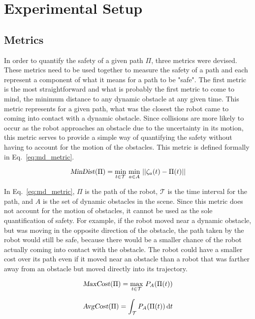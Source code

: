 


\chapter{Experimental Setup}

\label{chapter:experimentalsetup}

\section{Metrics}

In order to quantify the safety of a given path $\Pi$, three metrics were
devised. These metrics need to be used together to measure the safety of a path
and each represent a component of what it means for a path to be "safe". The
first metric is the most straightforward and what is probably the first metric
to come to mind, the minimum distance to any dynamic obstacle at any given
time. This metric represents for a given path, what was the closest the robot
came to coming into contact with a dynamic obstacle. Since collisions are more
likely to occur as the robot approaches an obstacle due to the uncertainty in
its motion, this metric serves to provide a simple way of quantifying the
safety without having to account for the motion of the obstacles. This metric
is defined formally in Eq.~\ref{eq:md_metric}.

\begin{equation}
    \Var{MinDist}(\Pi) = \min_{t \in \mathcal{T}} \, \min_{a \in A} \,
    ||\zeta_a(t) - \Pi(t)||
    \label{eq:md_metric}
\end{equation}

In Eq.~\ref{eq:md_metric}, $\Pi$ is the path of the robot, $\mathcal{T}$ is the
time interval for the path, and $A$ is the set of dynamic obstacles in the
scene. Since this metric does not account for the motion of obstacles, it
cannot be used as the sole quantification of safety. For example, if the robot
moved near a dynamic obstacle, but was moving in the opposite direction of the
obstacle, the path taken by the robot would still be safe, because there would
be a smaller chance of the robot actually coming into contact with the
obstacle. The robot could have a smaller cost over its path even if it moved
near an obstacle than a robot that was farther away from an obstacle but moved
directly into its trajectory.

\begin{equation}
    \Var{MaxCost}(\Pi) = \max_{t \in \mathcal{T}} \, P_A(\Pi(t))
    \label{eq:cost_metric}
\end{equation}

\begin{equation}
    \Var{AvgCost}(\Pi) = \int_{\mathcal{T}} P_A(\Pi(t)) \, \mathrm{d}t
    \label{eq:avg_cost_metric}
\end{equation}


